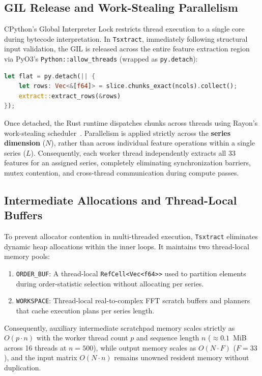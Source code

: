 \documentclass[conference]{IEEEtran}
\newcommand{\tsxtract}{\texttt{Tsxtract}}
\begin{document}
\subsection{GIL Release and Work-Stealing Parallelism}
CPython's Global Interpreter Lock restricts thread execution to a single core during bytecode interpretation. In \tsxtract{}, immediately following structural input validation, the GIL is released across the entire feature extraction region via PyO3's \texttt{Python::allow\_threads} (wrapped as \texttt{py.detach}):
\begin{lstlisting}[language=Rust]
let flat = py.detach(|| {
    let rows: Vec<&[f64]> = slice.chunks_exact(ncols).collect();
    extract::extract_rows(&rows)
});
\end{lstlisting}
Once detached, the Rust runtime dispatches chunks across threads using Rayon's work-stealing scheduler~\cite{matsakis2015rayon,blumofe1999scheduling}. Parallelism is applied strictly across the \textbf{series dimension} ($N$), rather than across individual feature operations within a single series ($L$). Consequently, each worker thread independently extracts all 33 features for an assigned series, completely eliminating synchronization barriers, mutex contention, and cross-thread communication during compute passes.

\subsection{Intermediate Allocations and Thread-Local Buffers}
To prevent allocator contention in multi-threaded execution, \tsxtract{} eliminates dynamic heap allocations within the inner loops. It maintains two thread-local memory pools:
\begin{enumerate}
    \item \texttt{ORDER\_BUF}: A thread-local \texttt{RefCell<Vec<f64>>} used to partition elements during order-statistic selection without allocating per series.
    \item \texttt{WORKSPACE}: Thread-local real-to-complex FFT scratch buffers and planners that cache execution plans per series length.
\end{enumerate}
Consequently, auxiliary intermediate scratchpad memory scales strictly as $O(p \cdot n)$ with the worker thread count $p$ and sequence length $n$ ($\approx 0.1$~MiB across 16 threads at $n=500$), while output memory scales as $O(N \cdot F)$ ($F=33$), and the input matrix $O(N \cdot n)$ remains unowned resident memory without duplication.
\end{document}
